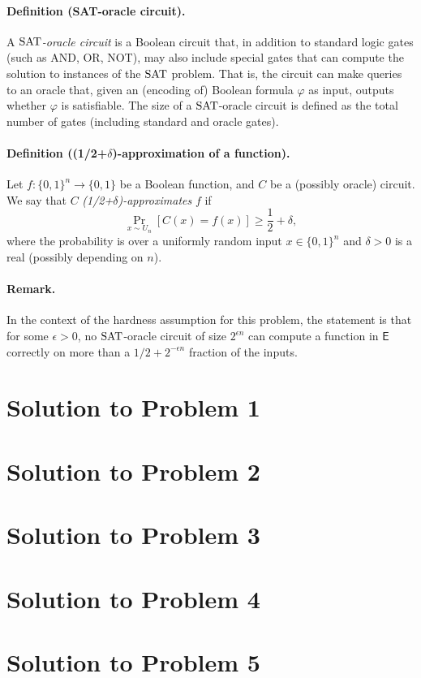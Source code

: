\documentclass[12pt]{article}
\begin{document}
\paragraph{Definition (SAT-oracle circuit).}
A \emph{$\text{SAT}$-oracle circuit} is a Boolean circuit that, in addition to standard logic gates (such as AND, OR, NOT), may also include special gates that can compute the solution to instances of the $\text{SAT}$ problem. That is, the circuit can make queries to an oracle that, given an (encoding of) Boolean formula $\varphi$ as input, outputs whether $\varphi$ is satisfiable. The size of a $\text{SAT}$-oracle circuit is defined as the total number of gates (including standard and oracle gates).

\paragraph{Definition ((1/2+$\delta$)-approximation of a function).}
Let $f:\{0,1\}^n\to\{0,1\}$ be a Boolean function, and $C$ be a (possibly oracle) circuit. We say that $C$ \emph{(1/2+$\delta$)-approximates} $f$ if
\[
\Pr_{x \sim U_n}\left[C(x) = f(x)\right] \ge \frac{1}{2} + \delta,
\]
where the probability is over a uniformly random input $x \in \{0,1\}^n$ and $\delta > 0$ is a real (possibly depending on $n$).

\paragraph{Remark.} In the context of the hardness assumption for this problem, the statement is that for some $\epsilon > 0$, no $\text{SAT}$-oracle circuit of size $2^{\epsilon n}$ can compute a function in $\mathsf{E}$ correctly on more than a $1/2+2^{-\epsilon n}$ fraction of the inputs.


\newpage


\section*{Solution to Problem 1}

\newpage
\section*{Solution to Problem 2}

\newpage
\section*{Solution to Problem 3}

\newpage
\section*{Solution to Problem 4}

\newpage
\section*{Solution to Problem 5}
\end{document}
